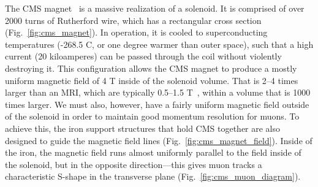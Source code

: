 The CMS magnet~\cite{CERN-LHCC-97-010} is a massive\footnotemark{} realization of a solenoid. 
It is comprised of over 2000 turns of Rutherford wire, which has a rectangular cross section (Fig.~\ref{fig:cms_magnet}). 
In operation, it is cooled to superconducting temperatures (-268.5 \de{}C, or one degree warmer than outer space), such that a high current (20 kiloamperes\footnotemark{}) can be passed through the coil without violently destroying it. 
This configuration allows the CMS magnet to produce a mostly uniform magnetic field of 4 T inside of the solenoid volume. 
That is 2--4 times larger than an MRI, which are typically 0.5--1.5 T~\cite{Berger2002-gs}, within a volume that is 1000 times larger. %
We must also, however, have a fairly uniform magnetic field outside of the solenoid in order to maintain good momentum resolution for muons. 
To achieve this, the iron support structures that hold CMS together are also designed to guide the magnetic field lines (Fig.~\ref{fig:cms_magnet_field}). 
Inside of the iron, the magnetic field runs almost uniformly parallel to the field inside of the solenoid, but in the opposite direction---this gives muon tracks a characteristic S-shape in the transverse plane (Fig.~\ref{fig:cms_muon_diagram}). 


